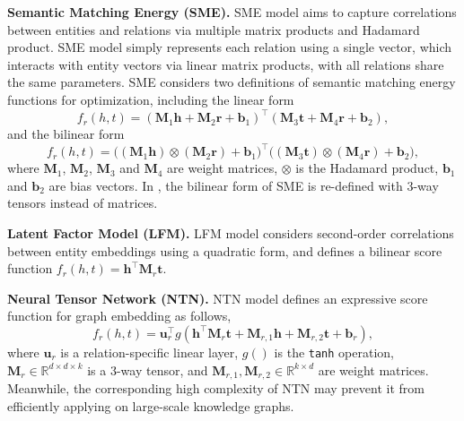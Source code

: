     \textbf{Semantic Matching Energy (SME).} SME model  aims to capture correlations between entities and relations via multiple matrix products and Hadamard product. SME model simply represents each relation using a single vector, which interacts with entity vectors via linear matrix products, with all relations share the same parameters. SME considers two definitions of semantic matching energy functions for optimization, including the linear form
    \begin{equation}
    f_r(h, t) = (\mathbf{M}_{1} \mathbf{h} + \mathbf{M}_{2} \mathbf{r} + \mathbf{b}_1 )^{\top} (\mathbf{M}_{3} \mathbf{t} + \mathbf{M}_{4} \mathbf{r} + \mathbf{b}_2),
    \end{equation}
    and the bilinear form
    \begin{equation}
    f_r(h, t) = \big( (\mathbf{M}_{1} \mathbf{h}) \otimes (\mathbf{M}_{2} \mathbf{r}) + \mathbf{b}_1 \big)^{\top} \big( (\mathbf{M}_{3} \mathbf{t}) \otimes (\mathbf{M}_{4} \mathbf{r}) + \mathbf{b}_2 \big),
    \end{equation}
    where $\mathbf{M}_{1}$, $\mathbf{M}_{2}$, $\mathbf{M}_{3}$ and $\mathbf{M}_{4}$ are weight matrices, $\otimes$ is the Hadamard product, $\mathbf{b}_1$ and $\mathbf{b}_2$ are bias vectors. In , the bilinear form of SME is re-defined with $3$-way tensors instead of matrices.

    \textbf{Latent Factor Model (LFM).} LFM model  considers second-order correlations between entity embeddings using a quadratic form,  and defines a bilinear score function $f_r(h, t) = \mathbf{h}^{\top}\mathbf{M}_r\mathbf{t}$.

    \textbf{Neural Tensor Network (NTN).} NTN model  defines an expressive score function for graph embedding as follows,
    \begin{equation}
    f_{r}(h, t) = \mathbf{u}_r^\top g (\mathbf{h}^{\top} \mathbf{M}_r \mathbf{t} + \mathbf{M}_{r, 1} \mathbf{h} + \mathbf{M}_{r, 2}\mathbf{t} + \mathbf{b}_r),
    \end{equation}
    where $\mathbf{u}_r$ is a relation-specific linear layer, $g()$ is the \texttt{tanh} operation, $\mathbf{M}_r \in \mathbb{R}^{d \times d \times k}$ is a $3$-way tensor, and $\mathbf{M}_{r, 1}, \mathbf{M}_{r, 2} \in  \mathbb{R}^{k\times d}$ are weight matrices. Meanwhile, the corresponding high complexity of NTN may prevent it from efficiently applying on large-scale knowledge graphs.

